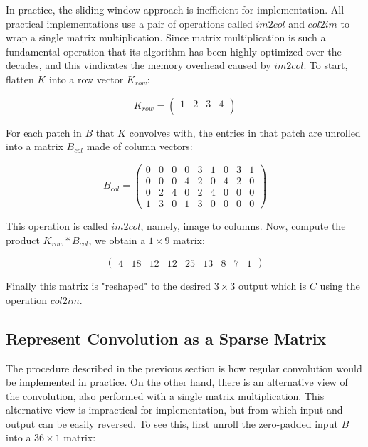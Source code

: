 In practice, the sliding-window approach is inefficient for implementation. All practical implementations
use a pair of operations called $im2col$ and $col2im$ to wrap a single matrix multiplication. Since
matrix multiplication is such a fundamental operation that its algorithm has been highly optimized over the
decades, and this vindicates the memory overhead caused by $im2col$. To start, flatten $K$ into a row vector
$K_{row}$:

$$
K_{row} =
  \begin{pmatrix}
    1 & 2 & 3 & 4 \\
  \end{pmatrix}
$$

For each patch in $B$ that $K$ convolves with, the entries in that patch are unrolled into a matrix $B_{col}$
made of column vectors:

$$
B_{col} =
  \begin{pmatrix}
    0 & 0 & 0 & 0 & 3 & 1 & 0 & 3 & 1 \\
    0 & 0 & 0 & 4 & 2 & 0 & 4 & 2 & 0 \\
    0 & 2 & 4 & 0 & 2 & 4 & 0 & 0 & 0 \\
    1 & 3 & 0 & 1 & 3 & 0 & 0 & 0 & 0
  \end{pmatrix}
$$

This operation is called $im2col$, namely, image to columns. Now, compute the product $K_{row} * B_{col}$, we
obtain a $1 \times 9$ matrix:

$$
\begin{pmatrix}
  4 & 18 & 12 & 12 & 25 & 13 & 8 & 7 & 1
\end{pmatrix}
$$

Finally this matrix is "reshaped" to the desired $3 \times 3$ output which is $C$ using the operation $col2im$.

\subsection{Represent Convolution as a Sparse Matrix}

The procedure described in the previous section is how regular convolution would be implemented in practice.
On the other hand, there is an alternative view of the convolution, also performed with a single
matrix multiplication. This alternative view is impractical for implementation, but from which
input and output can be easily reversed. To see this, first unroll the zero-padded input $B$ into
a $36 \times 1$ matrix:

\setcounter{MaxMatrixCols}{20}

